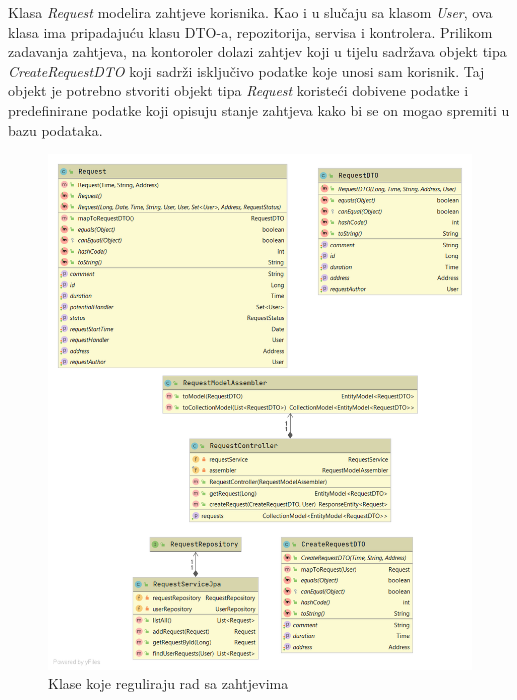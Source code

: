 				\newpage
				
				Klasa \textit{Request} modelira zahtjeve korisnika. Kao i u slučaju sa klasom \textit{User}, ova klasa ima pripadajuću klasu DTO-a, repozitorija, servisa i kontrolera. 
				Prilikom zadavanja zahtjeva, na kontoroler dolazi zahtjev koji u tijelu sadržava objekt tipa \textit{CreateRequestDTO} koji sadrži isključivo podatke koje unosi sam korisnik. Taj objekt je potrebno stvoriti objekt tipa \textit{Request} koristeći dobivene podatke i predefinirane podatke koji opisuju stanje zahtjeva kako bi se on mogao spremiti u bazu podataka.
				
				
			
				\begin{figure}[H]
					\includegraphics[scale=0.38]{slike/cs3.png} %
					\centering
					\caption{Klase koje reguliraju rad sa zahtjevima}
					
				\end{figure}
			
				\newpage
				

